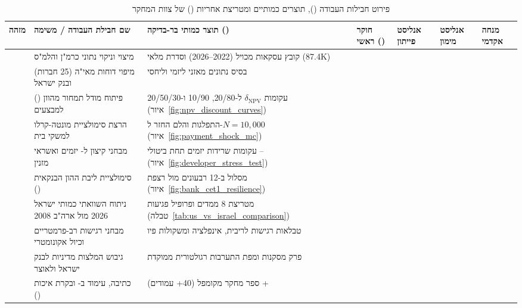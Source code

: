\begin{table}[htbp]
\caption{פירוט חבילות העבודה (), תוצרים כמותיים ומטריצת אחריות () של צוות המחקר \cite{segal2026prep,pmbok2021}}
\label{tab:wbs_raci_matrix}
\centering
\footnotesize
\renewcommand{\arraystretch}{1.24}
\begin{tabularx}{\textwidth}{R{1.4cm} R{3.4cm} Y C{1.3cm} C{1.3cm} C{1.3cm} C{1.3cm}}
\toprule
{}
\textbf{מזהה} & \textbf{שם חבילת העבודה / משימה} & \textbf{תוצר כמותי בר-בדיקה ()} & \textbf{חוקר ראשי ()} & \textbf{אנליסט פייתון} & \textbf{אנליסט מימון} & \textbf{מנחה אקדמי} \\
\midrule
\textbf{} & מיצוי וניקוי נתוני כרמ"ן והלמ"ס & קובץ עסקאות מכויל (\num{2022}--\num{2026}) וסדרת מלאי (\num{87.4K}) & \textbf{} & \textbf{} &  &  \\
\textbf{} & מיפוי דוחות מאי"ה (\num{25} חברות) ובנק ישראל & בסיס נתונים מאזני ליזמי  וליחסי  &  &  & \textbf{} &  \\
\textbf{} & פיתוח מודל תמחור מהוון () למבצעים & עקומות $\delta_{\text{NPV}}$ ל-\num{20/80}, \num{10/90} ו-\num{20/50/30} (איור~\ref{fig:npv_discount_curves}) &  & \textbf{} & \textbf{} &  \\
\textbf{} & הרצת סימולציית מונטה-קרלו למשקי בית & התפלגות  והלם החזר ל-$N=10,000$ (איור~\ref{fig:payment_shock_mc}) &  & \textbf{} &  &  \\
\textbf{} & מבחני קיצון ל- יזמים ואשראי מזנין & עקומות שרידות יזמים תחת ביטולי -- (איור~\ref{fig:developer_stress_test}) &  & \textbf{} & \textbf{} &  \\
\textbf{} & סימולציית ליבת ההון הבנקאית () & מסלול  ב-\num{12} רבעונים מול רצפת  (איור~\ref{fig:bank_cet1_resilience}) & \textbf{} & \textbf{} & \textbf{} &  \\
\textbf{} & ניתוח השוואתי כמותי ישראל \num{2026} מול ארה"ב \num{2008} & מטריצת \num{8} ממדים ופרופיל פגיעות (טבלה~\ref{tab:us_vs_israel_comparison}) & \textbf{} &  & \textbf{} &  \\
\textbf{} & מבחני רגישות רב-פרמטריים וכיול אקונומטרי & טבלאות רגישות לריבית, אינפלציה ומשקולות פיו &  & \textbf{} & \textbf{} &  \\
\textbf{} & גיבוש המלצות מדיניות לבנק ישראל ולאוצר & פרק מסקנות ומפת התערבות רגולטורית ממוקדת & \textbf{} &  &  &  \\
\textbf{} & כתיבה, עימוד ב-\en{\LaTeX} ובקרת איכות () & ספר מחקר מקומפל (\num{40}+ עמודים) +  & \textbf{} & \textbf{} & \textbf{} &  \\
\bottomrule
\end{tabularx}
\end{table}

